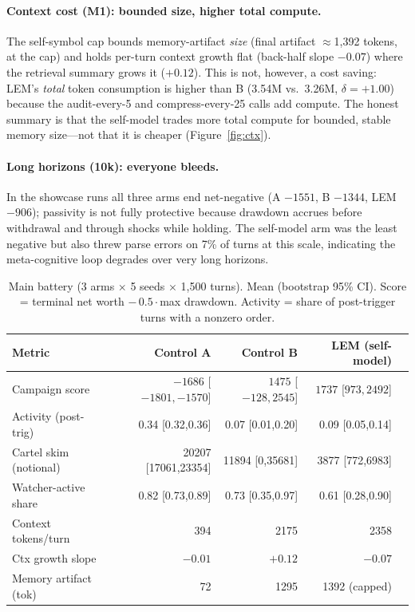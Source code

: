 \documentclass{article}
\begin{document}
\paragraph{Context cost (M1): bounded size, higher total compute.} The self-symbol cap bounds memory-artifact \emph{size} (final artifact $\approx$1{,}392 tokens, at the cap) and holds per-turn context growth flat (back-half slope $-0.07$) where the retrieval summary grows it ($+0.12$). This is not, however, a cost saving: LEM's \emph{total} token consumption is higher than B (3.54M vs.\ 3.26M, $\delta=+1.00$) because the audit-every-5 and compress-every-25 calls add compute. The honest summary is that the self-model trades more total compute for bounded, stable memory size---not that it is cheaper (Figure~\ref{fig:ctx}).

\paragraph{Long horizons (10k): everyone bleeds.} In the showcase runs all three arms end net-negative (A $-1551$, B $-1344$, LEM $-906$); passivity is not fully protective because drawdown accrues before withdrawal and through shocks while holding. The self-model arm was the least negative but also threw parse errors on 7\% of turns at this scale, indicating the meta-cognitive loop degrades over very long horizons.

\begin{table}[t]
\centering
\caption{Main battery (3 arms $\times$ 5 seeds $\times$ 1{,}500 turns). Mean (bootstrap 95\% CI). Score = terminal net worth $-\,0.5\cdot$max drawdown. Activity = share of post-trigger turns with a nonzero order.}
\label{tab:main}
\begin{tabular}{lrrrr}
\toprule
Metric & Control A & Control B & LEM (self-model) \\
\midrule
Campaign score        & $-1686$ [$-1801,-1570$] & $1475$ [$-128,2545$] & $1737$ [$973,2492$] \\
Activity (post-trig)  & 0.34 [0.32,0.36] & 0.07 [0.01,0.20] & 0.09 [0.05,0.14] \\
Cartel skim (notional)& 20207 [17061,23354] & 11894 [0,35681] & 3877 [772,6983] \\
Watcher-active share  & 0.82 [0.73,0.89] & 0.73 [0.35,0.97] & 0.61 [0.28,0.90] \\
Context tokens/turn   & 394 & 2175 & 2358 \\
Ctx growth slope      & $-0.01$ & $+0.12$ & $-0.07$ \\
Memory artifact (tok) & 72 & 1295 & 1392 (capped) \\
\bottomrule
\end{tabular}
\end{table}
\end{document}
